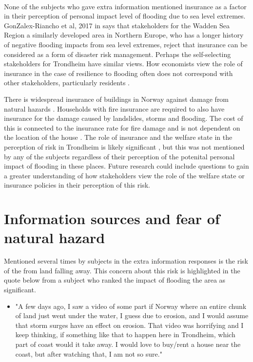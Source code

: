 \paragraph{}
None of the subjects who gave extra information mentioned insurance as a factor in their perception of personal impact level of flooding due to sea level extremes. GonZalex-Riancho et al, 2017 in \cite{gerkensmeier_governing_2018} says that stakeholders for the Wadden Sea Region a similarly developed area in Northern Europe, who has a longer history of negative flooding impacts from sea level extremes, reject that insurance can be considered as a form of disaster risk management. Perhaps the self-selecting stakeholders for Trondheim have similar views. How economists view the role of insurance in the case of resilience to flooding often does not correspond with other stakeholders, particularly residents \cite{gerkensmeier_governing_2018}.

There is widespread insurance of buildings in Norway against damage from natural hazards \cite{lujala_role_2020}. Households with fire insurance are required to also have insurance for the damage caused by landslides, storms and flooding. The cost of this is connected to the insurance rate for fire damage and is not dependent on the location of the house \cite{lujala_role_2020}. The role of insurance and the welfare state in the perception of risk in Trondheim is likely significant \cite{lujala_role_2020}, but this was not mentioned by any of the subjects regardless of their perception of the potenital personal impact of flooding in these places. Future research could include questions to gain a greater understanding of how stakeholders view the role of the welfare state or insurance policies in their perception of this risk. 






\section{Information sources and fear of natural hazard }
Mentioned several times by subjects in the extra information responses is the risk of the from land falling away. This concern about this risk is highlighted in the quote below from a subject who ranked the impact of flooding the area as significant.

\begin{itemize}
    \item "A few days ago, I saw a video of some part if Norway where an entire chunk of land just went under the water, I guess due to erosion, and I would assume that storm surges have an effect on erosion. That video was horrifying and I keep thinking, if something like that to happen here in Trondheim, which part of coast would it take away. I would love to buy/rent a house near the coast, but after watching that, I am not so sure."
\end{itemize}
